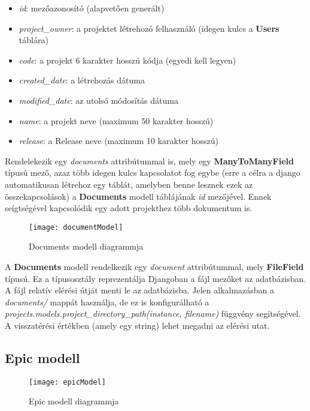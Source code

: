 \begin{itemize}
	\item \textit{id}: mezőazonosító (alapvetően generált)
	\item \textit{project\_owner}: a projektet létrehozó felhasználó (idegen kulcs a \textbf{Users} táblára)
	\item \textit{code}: a projekt 6 karakter hosszú kódja (egyedi kell legyen)
	\item \textit{created\_date}: a létrehozás dátuma
	\item \textit{modified\_date}: az utolsó módosítás dátuma
	\item \textit{name}: a projekt neve (maximum 50 karakter hosszú)
	\item \textit{release}: a Release neve (maximum 10 karakter hosszú)
\end{itemize}

Rendelekezik egy \textit{documents} attribútummal is, mely egy \textbf{ManyToManyField} típusú mező, azaz több idegen kulcs kapcsolatot fog egybe (erre a célra a django automatikusan létrehoz egy táblát, amelyben benne lesznek ezek az összekapcsolások) a \textbf{Documents} modell táblájának \textit{id} mezőjével. Ennek seígtségével kapcsolódik egy adott projekthez több dokumentum is.

\begin{figure}[H]
	\centering
	\texttt{[image: documentModel]}
	\caption{Documents modell diagrammja}
	\label{fig:docmodel}
\end{figure}

A \textbf{Documents} modell rendelkezik egy \textit{document} attribútummal, mely \textbf{FileField} típusú. Ez a típusosztály reprezentálja Djangoban a fájl mezőket az adatbázisban. A fájl relatív elérési útját menti le az adatbázisba. Jelen alkalmazásban a \textit{documents/} mappát használja, de ez is konfigurálható a \textit{projects.models.project\_directory\_path(instance, filename)} függvény segítségével. A visszatérési értékben (amely egy string) lehet megadni az elérési utat.

\subsection{Epic modell}

\begin{figure}[H]
	\centering
	\texttt{[image: epicModel]}
	\caption{Epic modell diagrammja}
	\label{fig:epicmodel}
\end{figure}

